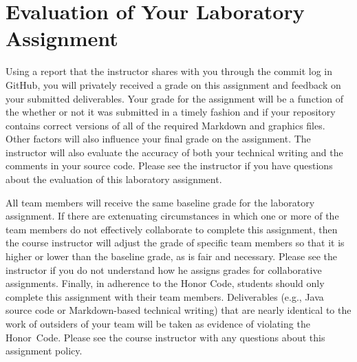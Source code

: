 \documentclass[11pt]{article}
\begin{document}
\section*{Evaluation of Your Laboratory Assignment}

Using a report that the instructor shares with you through the commit log in GitHub, you will privately received a grade
on this assignment and feedback on your submitted deliverables. Your grade for the assignment will be a function of the
whether or not it was submitted in a timely fashion and if your repository contains correct versions of all of the
required Markdown and graphics files. Other factors will also influence your final grade on the assignment. The
instructor will also evaluate the accuracy of both your technical writing and the comments in your source code. Please
see the instructor if you have questions about the evaluation of this laboratory assignment.

All team members will receive the same baseline grade for the laboratory assignment. If there are extenuating
circumstances in which one or more of the team members do not effectively collaborate to complete this assignment, then
the course instructor will adjust the grade of specific team members so that it is higher or lower than the baseline
grade, as is fair and necessary. Please see the instructor if you do not understand how he assigns grades for
collaborative assignments. Finally, in adherence to the Honor Code, students should only complete this assignment with
their team members. Deliverables (e.g., Java source code or Markdown-based technical writing) that are nearly identical
to the work of outsiders of your team will be taken as evidence of violating the \mbox{Honor Code}. Please see the
course instructor with any questions about this assignment policy.
\end{document}
